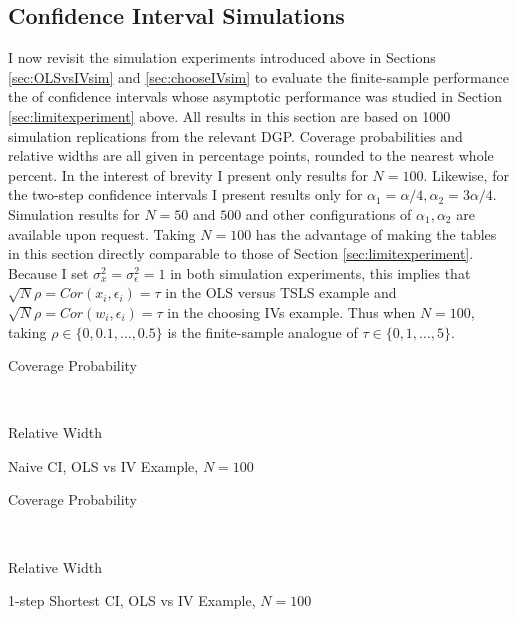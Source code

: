 \subsection{Confidence Interval Simulations}
\label{sec:CIsim}
I now revisit the simulation experiments introduced above in Sections \ref{sec:OLSvsIVsim} and \ref{sec:chooseIVsim} to evaluate the finite-sample performance the of confidence intervals whose asymptotic performance was studied in Section \ref{sec:limitexperiment} above.
All results in this section are based on 1000 simulation replications from the relevant DGP.
Coverage probabilities and relative widths are all given in percentage points, rounded to the nearest whole percent.
In the interest of brevity I present only results for $N=100$.
Likewise, for the two-step confidence intervals I present results only for $\alpha_1 = \alpha/4, \alpha_2 = 3\alpha/4$.
Simulation results for $N=50$ and $500$ and other configurations of $\alpha_1,\alpha_2$ are available upon request.
Taking $N=100$ has the advantage of making the tables in this section directly comparable to those of Section \ref{sec:limitexperiment}.
Because I set $\sigma_x^2 = \sigma_\epsilon^2 = 1$ in both simulation experiments, this implies that $\sqrt{N}\rho = Cor(x_i,\epsilon_i) = \tau$ in the OLS versus TSLS example and $\sqrt{N}\rho = Cor(w_i, \epsilon_i) = \tau$ in the choosing IVs example. 
Thus when $N = 100$, taking $\rho \in \{0, 0.1, \dots, 0.5\}$ is the finite-sample analogue of $\tau \in \{0, 1, \dots, 5\}$.





\begin{table}[h]
  \centering
  \begin{subtable}{0.48\textwidth}
    \caption{Coverage Probability}
    
  \end{subtable}
  ~
  \begin{subtable}{0.48\textwidth}
    \caption{Relative Width}
    
  \end{subtable}
  \caption{Naive CI, OLS vs IV Example, $N=100$}
  \label{tab:CISim100Naive_OLSvsIV}
\end{table}







\begin{table}[h]
  \centering
  \begin{subtable}{0.48\textwidth}
    \caption{Coverage Probability}
    
  \end{subtable}
  ~
  \begin{subtable}{0.48\textwidth}
    \caption{Relative Width}
    
  \end{subtable}
  \caption{1-step Shortest CI, OLS vs IV Example, $N=100$}
  \label{tab:CISim100_1stepShort_OLSvsIV}
\end{table}







